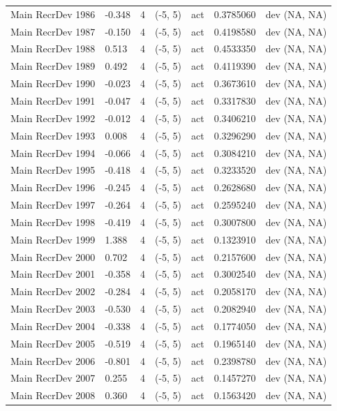 \documentclass[
  english,
  a4paper,
]{article}
\begin{document}
\begin{landscape}
\begin{longtable}[t]{>{\raggedright\arraybackslash}p{8.5cm}lllll>{\raggedright\arraybackslash}p{4cm}}
Main RecrDev 1986 & -0.348 & 4 & (-5, 5) & act & 0.3785060 & dev (NA, NA)\\
Main RecrDev 1987 & -0.150 & 4 & (-5, 5) & act & 0.4198580 & dev (NA, NA)\\
Main RecrDev 1988 & 0.513 & 4 & (-5, 5) & act & 0.4533350 & dev (NA, NA)\\
Main RecrDev 1989 & 0.492 & 4 & (-5, 5) & act & 0.4119390 & dev (NA, NA)\\
Main RecrDev 1990 & -0.023 & 4 & (-5, 5) & act & 0.3673610 & dev (NA, NA)\\
Main RecrDev 1991 & -0.047 & 4 & (-5, 5) & act & 0.3317830 & dev (NA, NA)\\
Main RecrDev 1992 & -0.012 & 4 & (-5, 5) & act & 0.3406210 & dev (NA, NA)\\
Main RecrDev 1993 & 0.008 & 4 & (-5, 5) & act & 0.3296290 & dev (NA, NA)\\
Main RecrDev 1994 & -0.066 & 4 & (-5, 5) & act & 0.3084210 & dev (NA, NA)\\
Main RecrDev 1995 & -0.418 & 4 & (-5, 5) & act & 0.3233520 & dev (NA, NA)\\
Main RecrDev 1996 & -0.245 & 4 & (-5, 5) & act & 0.2628680 & dev (NA, NA)\\
Main RecrDev 1997 & -0.264 & 4 & (-5, 5) & act & 0.2595240 & dev (NA, NA)\\
Main RecrDev 1998 & -0.419 & 4 & (-5, 5) & act & 0.3007800 & dev (NA, NA)\\
Main RecrDev 1999 & 1.388 & 4 & (-5, 5) & act & 0.1323910 & dev (NA, NA)\\
Main RecrDev 2000 & 0.702 & 4 & (-5, 5) & act & 0.2157600 & dev (NA, NA)\\
Main RecrDev 2001 & -0.358 & 4 & (-5, 5) & act & 0.3002540 & dev (NA, NA)\\
Main RecrDev 2002 & -0.284 & 4 & (-5, 5) & act & 0.2058170 & dev (NA, NA)\\
Main RecrDev 2003 & -0.530 & 4 & (-5, 5) & act & 0.2082940 & dev (NA, NA)\\
Main RecrDev 2004 & -0.338 & 4 & (-5, 5) & act & 0.1774050 & dev (NA, NA)\\
Main RecrDev 2005 & -0.519 & 4 & (-5, 5) & act & 0.1965140 & dev (NA, NA)\\
Main RecrDev 2006 & -0.801 & 4 & (-5, 5) & act & 0.2398780 & dev (NA, NA)\\
Main RecrDev 2007 & 0.255 & 4 & (-5, 5) & act & 0.1457270 & dev (NA, NA)\\
Main RecrDev 2008 & 0.360 & 4 & (-5, 5) & act & 0.1563420 & dev (NA, NA)\\

\end{longtable}
\end{landscape}
\end{document}

